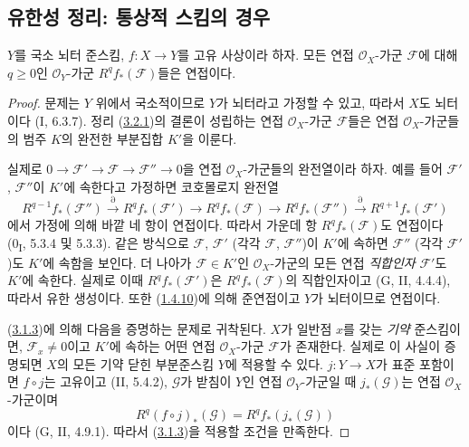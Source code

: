 \subsection{유한성 정리: 통상적 스킴의 경우}
\label{subsection:III.3.2-fr}

\begin{theorem}[3.2.1]
\label{III.3.2.1-fr}
$Y$를 국소 뇌터 준스킴, $f:X\to Y$를 고유 사상이라 하자. 모든 연접
$\mathcal O_X$-가군 $\mathcal F$에 대해 $q\geq0$인
$\mathcal O_Y$-가군 $R^qf_*(\mathcal F)$들은 연접이다.
\end{theorem}

\begin{proof}
문제는 $Y$ 위에서 국소적이므로 $Y$가 뇌터라고 가정할 수 있고,
따라서 $X$도 뇌터이다 (I, 6.3.7). 정리
(\hyperref[III.3.2.1-fr]{3.2.1})의 결론이 성립하는 연접
$\mathcal O_X$-가군 $\mathcal F$들은 연접 $\mathcal O_X$-가군들의
범주 $K$의 완전한 부분집합 $K'$을 이룬다.

실제로
$0\to\mathcal F'\to\mathcal F\to\mathcal F''\to0$을 연접
$\mathcal O_X$-가군들의 완전열이라 하자. 예를 들어
$\mathcal F'$, $\mathcal F''$이 $K'$에 속한다고 가정하면 코호몰로지
완전열
\[
R^{q-1}f_*(\mathcal F'')\xrightarrow{\partial}R^qf_*(\mathcal F')
\longrightarrow R^qf_*(\mathcal F)\longrightarrow R^qf_*(\mathcal F'')
\xrightarrow{\partial}R^{q+1}f_*(\mathcal F')
\]
에서 가정에 의해 바깥 네 항이 연접이다. 따라서 가운데 항
$R^qf_*(\mathcal F)$도 연접이다
(0\textsubscript{I}, 5.3.4 및 5.3.3). 같은 방식으로
$\mathcal F$, $\mathcal F'$ (각각 $\mathcal F$, $\mathcal F''$)이
$K'$에 속하면 $\mathcal F''$ (각각 $\mathcal F'$)도 $K'$에 속함을
보인다. 더 나아가 $\mathcal F\in K'$인 $\mathcal O_X$-가군의 모든
연접 \emph{직합인자} $\mathcal F'$도 $K'$에 속한다. 실제로 이때
$R^qf_*(\mathcal F')$은 $R^qf_*(\mathcal F)$의 직합인자이고
(G, II, 4.4.4), 따라서 유한 생성이다. 또한
(\hyperref[III.1.4.10-fr]{1.4.10})에 의해 준연접이고 $Y$가
뇌터이므로 연접이다.

(\hyperref[III.3.1.3-fr]{3.1.3})에 의해 다음을 증명하는 문제로
귀착된다. $X$가 일반점 $x$를 갖는 \emph{기약} 준스킴이면,
$\mathcal F_x\neq0$이고 $K'$에 속하는 어떤 연접
$\mathcal O_X$-가군 $\mathcal F$가 존재한다. 실제로 이 사실이
증명되면 $X$의 모든 기약 닫힌 부분준스킴 $Y$에 적용할 수 있다.
$j:Y\to X$가 표준 포함이면 $f\circ j$는 고유이고 (II, 5.4.2),
$\mathcal G$가 받침이 $Y$인 연접 $\mathcal O_Y$-가군일 때
$j_*(\mathcal G)$는 연접 $\mathcal O_X$-가군이며
\[
R^q(f\circ j)_*(\mathcal G)=R^qf_*(j_*(\mathcal G))
\]
이다 (G, II, 4.9.1). 따라서
(\hyperref[III.3.1.3-fr]{3.1.3})을 적용할 조건을 만족한다.


\end{proof}
